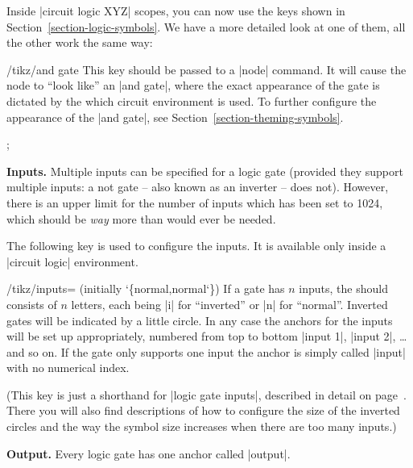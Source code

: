 Inside |circuit logic XYZ| scopes, you can now use the keys shown in
Section~\ref{section-logic-symbols}. We have a more detailed look at one of
them, all the other work the same way:

\begin{key}{/tikz/and gate}
    This key should be passed to a |node| command. It will cause the node to
    ``look like'' an |and gate|, where the exact appearance of the gate is
    dictated by the which circuit environment is used. To further configure the
    appearance of the |and gate|, see Section~\ref{section-theming-symbols}.
\begin{codeexample}[]
 ;
\end{codeexample}
\begin{codeexample}[]
\end{codeexample}

    \medskip\textbf{Inputs.}
    Multiple inputs can be specified for a logic gate (provided they support
    multiple inputs: a not gate -- also known as an inverter -- does not).
    However, there is an upper limit for the number of inputs which has been
    set to 1024, which should be \emph{way} more than would ever be needed.

    The following key is used to configure the inputs. It is available only
    inside a |circuit logic| environment.

    \begin{key}{/tikz/inputs= (initially \char`\{normal,normal\char`\})}
        If a gate has $n$ inputs, the  should consists of $n$
        letters, each being |i| for ``inverted'' or |n| for ``normal''.
        Inverted gates will be indicated by a little circle. In any case the
        anchors for the inputs will be set up appropriately, numbered from top
        to bottom |input 1|, |input 2|, \ldots and so on. If the gate only
        supports one input the anchor is simply called |input| with no
        numerical index.
\begin{codeexample}[]
\end{codeexample}
    \end{key}

    (This key is just a shorthand for |logic gate inputs|, described in detail
    on page~\pageref{logic-gate-inputs}. There you will also find descriptions
    of how to configure the size of the inverted circles and the way the symbol
    size increases when there are too many inputs.)

    \textbf{Output.}
    Every logic gate has one anchor called |output|.
\end{key}


